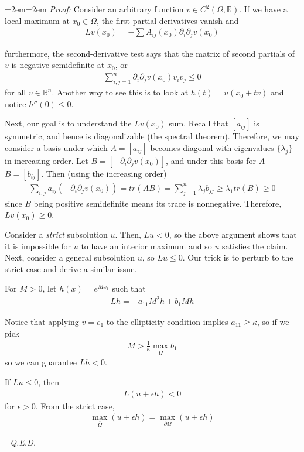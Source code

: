 \documentclass{article}
\newcommand{\R}{{\mathbb{R}}}
\newcommand{\cl}[1]{{\overline{#1}}}
\newcommand{\pd}{\partial}
\newenvironment{pf}{%
	\par%
	\medskip
	\leftskip=2em\rightskip=2em%
	\noindent\ignorespaces \textit{Proof:} \newline}{%
	\,\, \newline \textit{Q.E.D.}\par\medskip}
\begin{document}
	\begin{pf}
		Consider an arbitrary function $v \in C^{2}(\Omega, \R)$. If we have a local maximum at $x_0 \in \Omega$, the first partial derivatives vanish and 
		\begin{align*}
			Lv(x_0) = -\sum A_{ij}(x_0) \pd_{i}\pd_{j}v(x_0)
		\end{align*}
		
		furthermore, the second-derivative test says that the matrix of second partials of $v$ is negative semidefinite at $x_0$, or 
		\begin{align*}
			\sum_{i,j=1}^{n} \pd_{i}\pd_{j} v(x_0)v_{i}v_{j} \leq 0
		\end{align*}
		for all $v \in \R^{n}$. Another way to see this is to look at $h(t) = u(x_0 + tv)$ and notice $h''(0) \leq 0$. 
		
		Next, our goal is to understand the $Lv(x_0)$ sum. Recall that $[a_{ij}]$ is symmetric, and hence is diagonalizable (the spectral theorem). Therefore, we may consider a basis under which $A = [a_{ij}]$ becomes diagonal with eigenvalues $\{\lambda_{j}\}$ in increasing order. Let $B = [ -\pd_{i}\pd_{j} v(x_0)]$, and under this basis for $A$ $B = [b_{ij}]$. Then (using the increasing order)
		\begin{align*}
			\sum_{i,j} a_{ij}(-\pd_{i}\pd_{j}v(x_0)) = tr(AB) = \sum_{j=1}^{n} \lambda_{j}b_{jj} \geq \lambda_{1} tr(B) \geq0
		\end{align*}
		since $B$ being positive semidefinite means its trace is nonnegative. Therefore, $Lv(x_0) \geq 0$. 
		
		
		Consider a \textit{strict} subsolution $u$. Then, $Lu < 0$, so the above argument shows that it is impossible for $u$ to have an interior maximum and so $u$ satisfies the claim. Next, consider a general subsolution $u$, so $Lu \leq 0$. Our trick is to perturb to the strict case and derive a similar issue. 
		
		For $M>0$, let $h(x) = e^{Mx_1}$ such that 
		\begin{align*}
			Lh = -a_{11}M^{2}h + b_{1}Mh
		\end{align*} 
		
		Notice that applying $v = e_{1}$ to the ellipticity condition implies $a_{11} \geq \kappa$, so if we pick 
		\begin{align*}
			M > \frac{1}{\kappa} \max_{\cl{\Omega}} b_{1}
		\end{align*}
		so we can guarantee $Lh < 0$. 
		
		If $Lu \leq 0$, then
		\begin{align*}
			L(u+\epsilon h) < 0
		\end{align*}
		for $\epsilon > 0$. From the strict case, 
		\begin{align*}
			\max_{\cl{\Omega}} (u+\epsilon h) = \max_{\pd \Omega} (u+\epsilon h) 
		\end{align*}
		

\end{pf}
\end{document}
